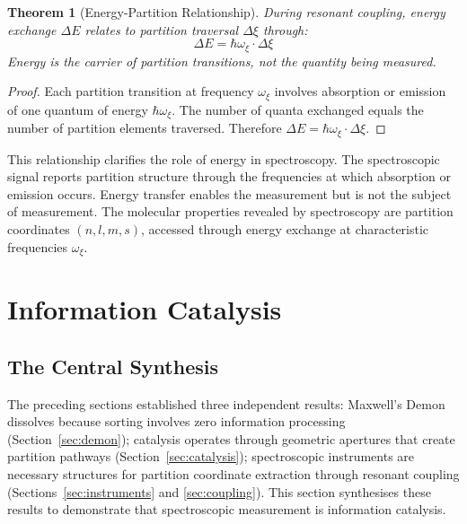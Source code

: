 \documentclass[twocolumn,10pt,a4paper]{article}
\newtheorem{theorem}{Theorem}[section]
\theoremstyle{definition}
\theoremstyle{remark}
\begin{document}
\begin{theorem}[Energy-Partition Relationship]
\label{thm:energy_partition}
During resonant coupling, energy exchange $\Delta E$ relates to partition traversal $\Delta\xi$ through:
\begin{equation}
\Delta E = \hbar \omega_\xi \cdot \Delta\xi
\end{equation}
Energy is the carrier of partition transitions, not the quantity being measured.
\end{theorem}

\begin{proof}
Each partition transition at frequency $\omega_\xi$ involves absorption or emission of one quantum of energy $\hbar\omega_\xi$. The number of quanta exchanged equals the number of partition elements traversed. Therefore $\Delta E = \hbar\omega_\xi \cdot \Delta\xi$.
\end{proof}

This relationship clarifies the role of energy in spectroscopy. The spectroscopic signal reports partition structure through the frequencies at which absorption or emission occurs. Energy transfer enables the measurement but is not the subject of measurement. The molecular properties revealed by spectroscopy are partition coordinates $(n, l, m, s)$, accessed through energy exchange at characteristic frequencies $\omega_\xi$.

\section{Information Catalysis}
\label{sec:catalysis_info}

\subsection{The Central Synthesis}

The preceding sections established three independent results: Maxwell's Demon dissolves because sorting involves zero information processing (Section~\ref{sec:demon}); catalysis operates through geometric apertures that create partition pathways (Section~\ref{sec:catalysis}); spectroscopic instruments are necessary structures for partition coordinate extraction through resonant coupling (Sections~\ref{sec:instruments} and \ref{sec:coupling}). This section synthesises these results to demonstrate that spectroscopic measurement is information catalysis.
\end{document}
